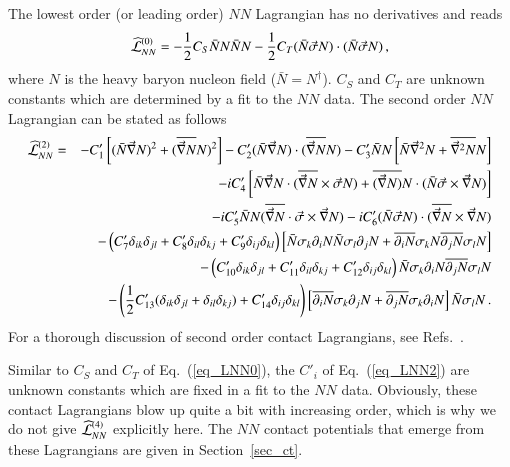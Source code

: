 \documentclass[sort&compress,preprint,3p]{elsarticle}
\begin{document}
The lowest order (or leading order) $NN$ Lagrangian has no derivatives 
and reads~\cite{Wei90,Wei91}
%
\begin{equation}
\label{eq_LNN0}
\widehat{\cal L}^{(0)}_{NN} =
-\frac{1}{2} C_S \bar{N} N \bar{N} N 
-\frac{1}{2} C_T (\bar{N} \vec \sigma N) \cdot (\bar{N} \vec \sigma N) \, ,
\end{equation}
%
where $N$ is the heavy baryon nucleon field ($\bar{N}=N^\dagger$).
$C_S$ and $C_T$ are unknown constants which are determined
by a fit to the $NN$ data.
The second order $NN$ Lagrangian can be stated as
follows~\cite{ORK96}
\begin{eqnarray}
\label{eq_LNN2}
\widehat{\cal L}^{(2)}_{NN} &=&
-C'_1 \left[(\bar{N} \vec \nabla N)^2+ (\overline{\vec \nabla N} N)^2 \right]
-C'_2 (\bar{N} \vec \nabla N)\cdot (\overline{\vec \nabla N} N)
-C'_3 \bar{N} N \left[\bar N \vec \nabla^2 N+\overline{\vec \nabla^2 N} N \right]
\nonumber \\ &&
-i C'_4 \left[
\bar N \vec \nabla N \cdot 
(\overline{\vec \nabla N} \times \vec \sigma N) +
\overline{(\vec \nabla N)} N \cdot 
(\bar N \vec \sigma \times \vec \nabla N) \right]
\nonumber \\ &&
-i C'_5 \bar N N(\overline{\vec \nabla N} \cdot \vec \sigma \times \vec \nabla N)
-i C'_6 (\bar N \vec \sigma N)\cdot (\overline{\vec \nabla N} \times \vec \nabla N)
\nonumber \\ &&
-\left(C'_7 \delta_{ik} \delta_{jl}+C'_8 \delta_{il} \delta_{kj}
+C'_9 \delta_{ij} \delta_{kl}\right)
\left[\bar N \sigma_k \partial_i N \bar N \sigma_l \partial_j N +
\overline{\partial_i N} \sigma_k N \overline{\partial_j N} \sigma_l N \right]
\nonumber \\ &&
-\left(C'_{10} \delta_{ik} \delta_{jl}+C'_{11} \delta_{il} \delta_{kj}+C'_{12} \delta_{ij} \delta_{kl}\right)
\bar N \sigma_k \partial_i N \overline{\partial_j N} \sigma_l N
\nonumber \\ &&
-\left(\frac{1}{2} C'_{13} (\delta_{ik} \delta_{jl}+
\delta_{il} \delta_{kj}) 
+C'_{14} \delta_{ij} \delta_{kl} \right)
\left[\overline{\partial_i N} \sigma_k \partial_j N + \overline{\partial_j N} \sigma_k \partial_i N\right]
\bar N \sigma_l N \, .
\end{eqnarray}
For a thorough discussion of second order contact Lagrangians, see Refs.~\cite{Epe00,Gir10}. 

Similar to $C_S$ and $C_T$ of Eq.~(\ref{eq_LNN0}), the $C'_i$ of Eq.~(\ref{eq_LNN2}) are unknown constants 
which are fixed in a fit to the $NN$ data.
Obviously, these contact Lagrangians blow up quite a bit
with increasing order, which is why we do not give
$\widehat{\cal L}^{(4)}_{NN}$
explicitly here.
The $NN$ contact potentials that emerge from these Lagrangians
are given in Section~\ref{sec_ct}.
\end{document}

